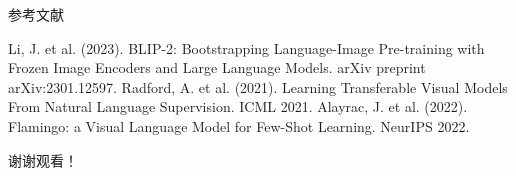 \documentclass{beamer}
\begin{document}
\begin{frame}{参考文献}
  \begin{thebibliography}{9}
     Li, J. et al. (2023). BLIP-2: Bootstrapping Language-Image Pre-training with Frozen Image Encoders and Large Language Models. arXiv preprint arXiv:2301.12597.
     Radford, A. et al. (2021). Learning Transferable Visual Models From Natural Language Supervision. ICML 2021.
     Alayrac, J. et al. (2022). Flamingo: a Visual Language Model for Few-Shot Learning. NeurIPS 2022.
  \end{thebibliography}
\end{frame}

\begin{frame}
  \centering
  \LARGE{谢谢观看！}
  \vspace{1cm}
\end{frame}
\end{document}
